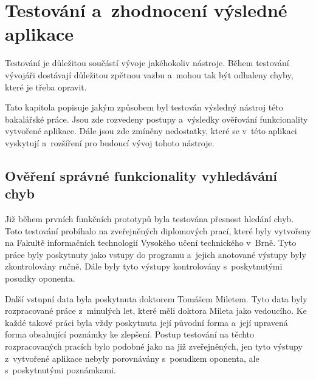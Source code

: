 



\chapter{Testování a~zhodnocení výsledné aplikace} \label{testing}
Testování je důležitou součástí vývoje jakéhokoliv nástroje. Během testování
vývojáři dostávají důležitou zpětnou vazbu a~mohou tak být odhaleny chyby,
které je třeba opravit.

Tato kapitola popisuje jakým způsobem byl testován výsledný nástroj této
bakalářské práce. Jsou zde rozvedeny postupy a~výsledky ověřování funkcionality
vytvořené aplikace. Dále jsou zde zmíněny nedostatky, které se v~této aplikaci
vyskytují a~rozšíření pro budoucí vývoj tohoto nástroje. 



\section{Ověření správné funkcionality vyhledávání chyb}
Již během prvních funkčních prototypů byla testována přesnost hledání
chyb. Toto testování probíhalo na zveřejněných diplomových prací, které byly
vytvořeny na Fakultě informačních technologií Vysokého učení technického v~Brně.
Tyto práce byly poskytnuty jako vstupy do programu a~jejich anotované
výstupy byly zkontrolovány ručně. Dále byly tyto výstupy kontrolovány
s~poskytnutými posudky oponenta.

Další vstupní data byla poskytnuta doktorem Tomášem Miletem. Tyto data
byly rozpracované práce z~minulých let, které měli doktora Mileta jako
vedoucího. Ke každé takové práci byla vždy poskytnuta její původní forma
a~její upravená forma obsahující poznámky ke zlepšení. Postup testování
na těchto rozpracovaných pracích bylo podobné jako na již zveřejněných, 
jen tyto výstupy z~vytvořené aplikace nebyly porovnávány s~posudkem oponenta,
ale s~poskytnutými poznámkami.



